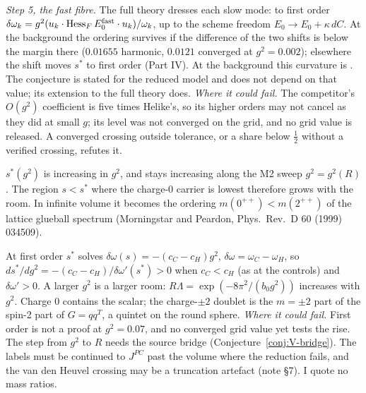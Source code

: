 \begin{sketch}
\emph{Step 5, the fast fibre.} The full theory dresses each slow mode: to first order
$\delta\omega_k=g^2(u_k\cdot\operatorname{Hess}_FE_0^{\rm fast}\cdot u_k)/\omega_k$, up to the scheme freedom
$E_0\to E_0+\kappa\,dC$. At the background the ordering survives if the difference of the two shifts is below the margin
there ($0.01655$ harmonic, $0.0121$ converged at $g^2=0.002$); elsewhere the shift moves $s^*$ to first order (Part IV). At the background this curvature is \MthreeBackground. The conjecture is stated for the reduced model and
does not depend on that value; its extension to the full theory does.
\emph{Where it could fail.} The competitor's $O(g^2)$ coefficient is five times Helike's, so its higher orders may not
cancel as they did at small $g$; its level was not converged on the grid, and no grid value is released. A converged
crossing outside tolerance, or a share below $\frac12$ without a verified crossing, refutes it.
\end{sketch}

\begin{conjecture}\label{conj:V-glueball}
$s^*(g^2)$ is increasing in $g^2$, and stays increasing along the M2 sweep $g^2=g^2(R)$. The region $s<s^*$ where the
charge-0 carrier is lowest therefore grows with the room. In infinite volume it becomes the ordering
$m(0^{++})<m(2^{++})$ of the lattice glueball spectrum (Morningstar and Peardon, Phys.\ Rev.\ D 60 (1999) 034509).
\end{conjecture}
\begin{sketch}
At first order $s^*$ solves $\delta\omega(s)=-(c_C-c_H)g^2$, $\delta\omega=\omega_C-\omega_H$, so
$ds^*/dg^2=-(c_C-c_H)/\delta\omega'(s^*)>0$ when $c_C<c_H$ (as at the controls) and $\delta\omega'>0$. A larger $g^2$ is a
larger room: $R\Lambda=\exp(-8\pi^2/(b_0g^2))$ increases with $g^2$. Charge 0 contains the scalar; the charge-$\pm2$ doublet is the
$m=\pm2$ part of the spin-2 part of $G=qq^T$, a quintet on the round sphere. \emph{Where it could fail.} First order
is not a proof at $g^2=0.07$, and no converged grid value yet tests the rise. The step from $g^2$ to $R$ needs the source bridge
(Conjecture~\ref{conj:V-bridge}). The labels must be continued to $J^{PC}$ past the volume where the reduction
fails, and the van den Heuvel crossing may be a truncation artefact (note \S7). I quote no mass ratios.
\end{sketch}

\medskip{}

